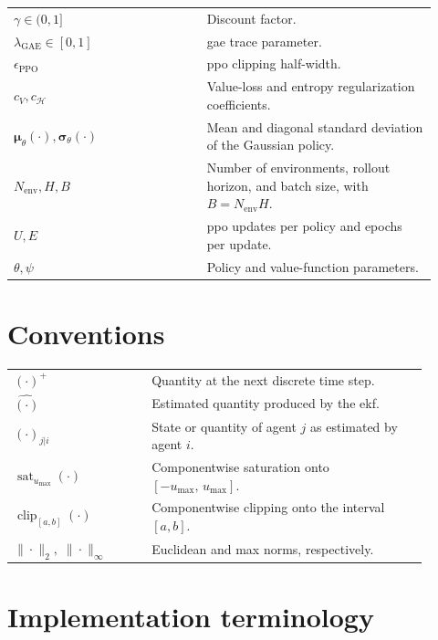 \begin{longtable}{>{\raggedright\arraybackslash}p{0.42\linewidth}
                  >{\raggedright\arraybackslash}p{0.50\linewidth}}
\(\gamma \in (0,1]\) & Discount factor.\\
\(\lambda_{\mathrm{GAE}}\in[0,1]\) & \acs{gae} trace parameter.\\
\(\epsilon_{\mathrm{PPO}}\) & \acs{ppo} clipping half-width.\\
\(c_V, c_{\mathcal{H}}\) & Value-loss and entropy regularization coefficients.\\
\(\boldsymbol{\mu}_\theta(\cdot),\boldsymbol{\sigma}_\theta(\cdot)\) & Mean and diagonal standard deviation of the Gaussian policy.\\
\(N_{\mathrm{env}},H,B\) & Number of environments, rollout horizon, and batch size, with \(B=N_{\mathrm{env}}H\).\\
\(U,E\) & \acs{ppo} updates per policy and epochs per update.\\
\(\theta,\psi\) & Policy and value-function parameters.\\
\end{longtable}

\section{Conventions}
\label{appendix:methodology-conventions}

\begin{center}
\renewcommand{\arraystretch}{1.15}
\begin{tabular}{p{0.30\linewidth}p{0.60\linewidth}}
\((\cdot)^{+}\) & Quantity at the next discrete time step.\\
\(\hat{(\cdot)}\) & Estimated quantity produced by the \acs{ekf}.\\
\((\cdot)_{j|i}\) & State or quantity of agent \(j\) as estimated by agent \(i\).\\
\(\operatorname{sat}_{u_{\max}}(\cdot)\) & Componentwise saturation onto \([ -u_{\max},\,u_{\max}]\).\\
\(\operatorname{clip}_{[a,b]}(\cdot)\) & Componentwise clipping onto the interval \([a,b]\).\\
\(\|\cdot\|_2,\;\|\cdot\|_\infty\) & Euclidean and max norms, respectively.\\
\end{tabular}
\end{center}

\section{Implementation terminology}
\label{appendix:methodology-implementation-terminology}

